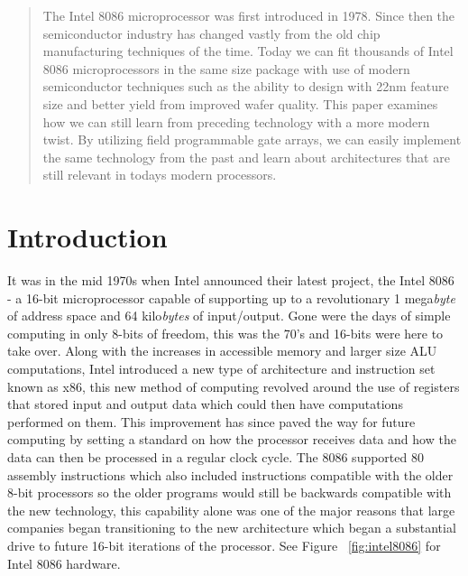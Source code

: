\documentclass[pdftex,10.5pt]{report}
\begin{document}


\begin{abstract}
The Intel 8086 microprocessor was first introduced in 1978. Since then the semiconductor industry has changed vastly from the old chip manufacturing techniques of the time. Today we can fit thousands of Intel 8086 microprocessors in the same size package with use of modern semiconductor techniques such as the ability to design with 22nm feature size and better yield from improved wafer quality. This paper examines how we can still learn from preceding technology with a more modern twist. By utilizing field programmable gate arrays, we can easily implement the same technology from the past and learn about architectures that are still relevant in todays modern processors.
\end{abstract}

\tableofcontents

\section{Introduction}
It was in the mid 1970s when Intel announced their latest project, the Intel 8086 -  a 16-bit microprocessor capable of supporting up to a revolutionary 1 mega{\em byte} of address space and 64 kilo{\em bytes} of input/output. Gone were the days of simple computing in only 8-bits of freedom, this was the 70's and 16-bits were here to take over. Along with the increases in accessible memory and larger size ALU computations, Intel introduced a new type of architecture and instruction set known as x86, this new method of computing revolved around the use of registers that stored input and output data which could then have computations performed on them. This improvement has since paved the way for future computing by setting a standard on how the processor receives data and how the data can then be processed in a regular clock cycle. The 8086 supported 80 assembly instructions which also included instructions compatible with the older 8-bit processors so the older programs would still be backwards compatible with the new technology, this capability alone was one of the major reasons that large companies began transitioning to the new architecture which began a substantial drive to future 16-bit iterations of the processor. See Figure ~\ref{fig:intel8086} for Intel 8086 hardware.
\end{document}
